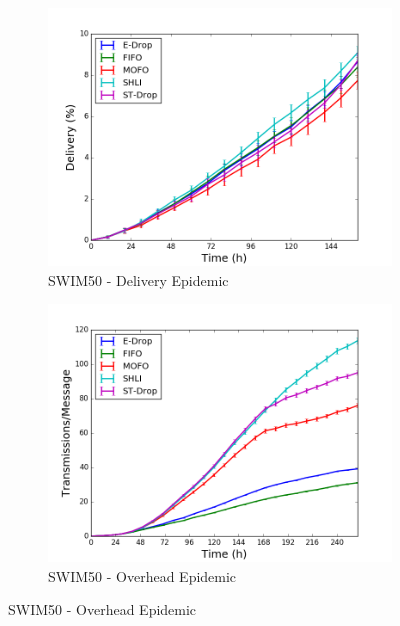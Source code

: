 \begin{figure}
    \begin{subfigure}[b]{0.5\columnwidth}
        \includegraphics[width=\linewidth]{imgs/swim/50/Epidemic-delivery.png}
        \caption{SWIM50 - Delivery Epidemic}
        \label{fig:swim50EpidemicDel}
    \end{subfigure}
    \hfill %
    \begin{subfigure}[b]{0.5\columnwidth}
        \includegraphics[width=\linewidth]{imgs/swim/50/Epidemic-overhead.png}
        \caption{SWIM50 - Overhead Epidemic}
        \label{fig:swim50EpidemicOver}
    \end{subfigure}


\end{figure}
